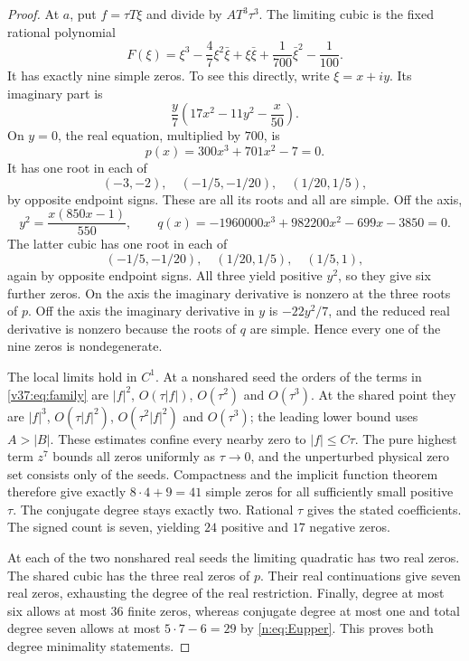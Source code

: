 \documentclass[UTF8,11pt]{ctexart}
\theoremstyle{definition}
\numberwithin{equation}{section}
\begin{document}
\begin{proof}
At $a$, put $f=\tau T\xi$ and divide by $AT^3\tau^3$.
The limiting cubic is the fixed rational polynomial
\begin{equation}\label{v37:eq:localcubic}
 F(\xi)=\xi^3-\frac47\xi^2\bar\xi+\xi\bar\xi
                         +\frac1{700}\bar\xi^2-\frac1{100}.
\end{equation}
It has exactly nine simple zeros. To see this directly, write
$\xi=x+iy$. Its imaginary part is
\[
                    \frac y7\left(17x^2-11y^2-\frac{x}{50}\right).
\]
On $y=0$, the real equation, multiplied by $700$, is
\[
                         p(x)=300x^3+701x^2-7=0.
\]
It has one root in each of
\[
 (-3,-2),\quad(-1/5,-1/20),\quad(1/20,1/5),
\]
by opposite endpoint signs. These are all its roots and all
are simple. Off the axis,
\[
 y^2=\frac{x(850x-1)}{550},\qquad
 q(x)=-1960000x^3+982200x^2-699x-3850=0.
\]
The latter cubic has one root in each of
\[
 (-1/5,-1/20),\quad(1/20,1/5),\quad(1/5,1),
\]
again by opposite endpoint signs. All three yield positive
$y^2$, so they give six further zeros. On the axis the imaginary
derivative is nonzero at the three roots of $p$. Off the axis
the imaginary derivative in $y$ is $-22y^2/7$, and the reduced
real derivative is nonzero because the roots of $q$ are simple.
Hence every one of the nine zeros is nondegenerate.

The local limits hold in $C^1$. At a nonshared seed the orders
of the terms in \eqref{v37:eq:family} are
$|f|^2$, $O(\tau|f|)$, $O(\tau^2)$ and $O(\tau^3)$.
At the shared point they are
$|f|^3$, $O(\tau|f|^2)$, $O(\tau^2|f|^2)$ and $O(\tau^3)$;
the leading lower bound uses $A>|B|$.
These estimates confine every nearby zero to $|f|\le C\tau$.
The pure highest term $z^7$ bounds all zeros uniformly as
$\tau\to0$, and the unperturbed physical zero set consists
only of the seeds. Compactness and the implicit function theorem
therefore give exactly $8\cdot4+9=41$ simple zeros for all
sufficiently small positive $\tau$.
The conjugate degree stays exactly two. Rational $\tau$ gives
the stated coefficients. The signed count is seven, yielding
$24$ positive and $17$ negative zeros.

At each of the two nonshared real seeds the limiting quadratic
has two real zeros. The shared cubic has the three real zeros
of $p$. Their real continuations give seven real zeros, exhausting
the degree of the real restriction. Finally, degree at most six
allows at most $36$ finite zeros, whereas conjugate degree at
most one and total degree seven allows at most
$5\cdot7-6=29$ by \eqref{n:eq:Eupper}. This proves both degree
minimality statements.
\end{proof}
\end{document}
